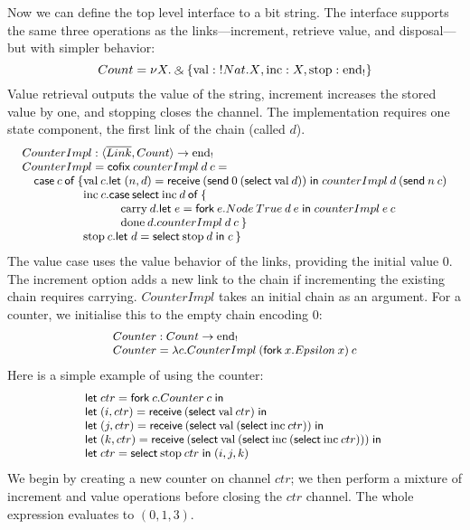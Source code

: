 \documentclass[orivec,envcountsame]{llncs}
\makeatletter
\newcommand{\with}{\mathbin\binampersand}
\newcommand{\gvdual}[1]{\overline{#1}}
\newcommand{\gvout}[2]{{!#1.#2}}
\newcommand{\uto}{\ensuremath{\rightarrow}}
\newcommand{\outterm}{\mathrm{end}_!}
\newcommand{\mkwd}[1]{\mathsf{#1}}
\newcommand{\clabel}[1]{\mathrm{#1}}
\newcommand{\gvsend}[2]{\mkwd{send}\:#1\:#2}
\newcommand{\gvreceive}[1]{\mkwd{receive}\:#1}
\newcommand{\gvlet}[3]{\mkwd{let}\;#1 = #2\;\mkwd{in}\;#3}
\newcommand{\gvselect}[2]{\mkwd{select}\:#1\:#2}
\newcommand{\gvfork}[2]{\mkwd{fork}\:#1.#2}
\newcommand{\lrkwd}{\mkwd{cofix}}
\newcommand{\ba}{\begin{array}}
\newcommand{\ea}{\end{array}}
\newcommand{\bl}{\ba[t]{@{}l@{}}}
\newcommand{\el}{\ea}
\makeatother
\begin{document}
Now we can define the top level interface to a bit string. The interface supports the same three
operations as the links---increment, retrieve value, and disposal---but with simpler behavior:
\[\small
  Count = \nu X. \with \{ \clabel{val}: \gvout{Nat}{X}, \clabel{inc}: X, \clabel{stop}: \outterm \}
\]
Value retrieval outputs the value of the string, increment increases the stored value by one, and
stopping closes the channel. The implementation requires one state component, the first link of the
chain (called $d$).
\[\small
\bl
CounterImpl : \langle \gvdual{Link}, Count \rangle \uto \outterm \\
CounterImpl = \lrkwd\:counterImpl\:d\:c = \\
\quad \mkwd{case}\:c\:\mkwd{of}\:\{
  \bl
  \clabel{val}\:c.
     \bl
     \gvlet{(n,d)}{\gvreceive{(\gvsend{0}{(\gvselect{\clabel{val}}{d})})}}
     {counterImpl\:d\:(\gvsend{n}{c})} \\
     \el \\
  \clabel{inc}\:c.
    \bl
    \mkwd{case}\:\gvselect{\clabel{inc}}{d}\:\mkwd{of}\:\{ \\
    \quad
      \bl
      \clabel{carry}\:d.
         \bl
         \gvlet{e}{\gvfork{e}{Node\:True\:d\:e}}{
         counterImpl\:e\:c} \\
         \el \\
      \clabel{done}\:d.counterImpl\:d\:c\:\} \\
      \el \\
    \el \\
  \clabel{stop}\:c.\gvlet{d}{\gvselect{\clabel{stop}}{d}}{c}\:\}
  \el \\
\el
\]
The value case uses the value behavior of the links, providing the initial value 0.  The increment
option adds a new link to the chain if incrementing the existing chain requires
carrying. $CounterImpl$ takes an initial chain as an argument. For a counter, we initialise this to
the empty chain encoding $0$:
\[\small\bl
  Counter : Count \uto \outterm \\
  Counter = \lambda c.CounterImpl\:(\gvfork{x}{Epsilon\:x})\:c \\
\el\]
Here is a simple example of using the counter:
\[\small
\bl
\gvlet{ctr}{\gvfork{c}{Counter\:c}}{} \\
\gvlet{(i,ctr)}{\gvreceive{(\gvselect{\clabel{val}}{ctr})}}{} \\
\gvlet{(j,ctr)}{\gvreceive{(\gvselect{\clabel{val}}{(\gvselect{\clabel{inc}}{ctr})})}}{} \\
\gvlet{(k,ctr)}{\gvreceive{(\gvselect{\clabel{val}}{(\gvselect{\clabel{inc}}{(\gvselect{\clabel{inc}}{ctr})})})}}{} \\
\gvlet{ctr}{\gvselect{\clabel{stop}}{ctr}}{(i,j,k)}
\el
\]
We begin by creating a new counter on channel $ctr$; we then perform a mixture of increment and
value operations before closing the $ctr$ channel.  The whole expression evaluates to $(0,1,3)$.
\end{document}
